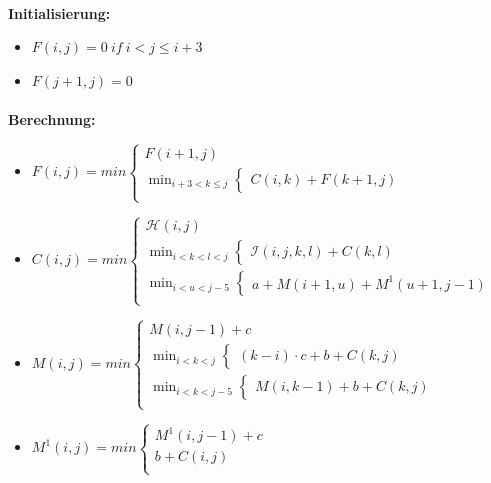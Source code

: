 \paragraph{}
\textbf{Initialisierung:}
\begin{itemize}
	\item[] $F(i,j)=0\ if \ i<j\le i+3$ 
	\item[] $F(j+1, j) = 0$
\end{itemize}
\paragraph{}
\textbf{Berechnung:}
\begin{itemize}
	\item[]$F(i,j)=min
			\begin{cases}
               F(i+1, j)\\
               \displaystyle\min_{i+3 < k \le j} \begin{cases} C(i,k) + F(k+1, j) \end{cases}\\
			\end{cases}$

	\item[] $C(i,j) = min
		\begin{cases}
			\mathcal{H}(i,j)\\
			\displaystyle\min_{i < k < l < j} \begin{cases} \mathcal{I}(i,j,k,l) + C(k,l) \end{cases}\\
			\displaystyle\min_{i < u < j-5} \begin{cases} a + M(i+1, u) + M^1(u+1, j-1) \end{cases}\\
		\end{cases}$
	\item[] $M(i,j) = min
		\begin{cases}
			M(i,j-1) + c\\
			\displaystyle\min_{i < k < j} \begin{cases} (k-i) \cdot c + b + C(k,j)\end{cases}\\
			\displaystyle\min_{i < k < j-5} \begin{cases} M(i, k-1) + b + C(k,j)\end{cases}\\
		\end{cases}$
	\item[]$M^1(i,j) = min
		\begin{cases}
			M^1(i,j-1) + c\\
			b + C(i,j)\\
		\end{cases}$
\end{itemize}
